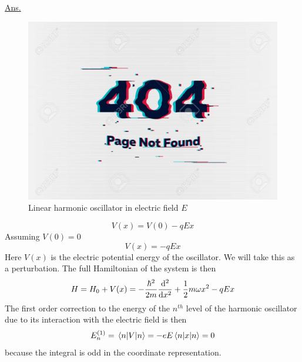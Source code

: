 \begin{enumerate}[label=Problem.\arabic*,start=1]
			\underline{Ans.}
			\begin{figure}
				\centering
				\includegraphics[width=0.5\linewidth]{Pictures/not-found.jpg}
				\caption{Linear harmonic oscillator in electric field $E$}
			\end{figure}
		\begin{equation}
			V(x) = V(0) - q E x
		\end{equation}
		Assuming $V(0) = 0$
		\begin{equation}
			V(x) =  - q E x
		\end{equation}
			Here $V(x)$ is the electric potential energy of the oscillator. We will take this as a perturbation. The full Hamiltonian of the system is then
			\begin{equation}
				H = H_0 + V(x) = - \frac{\hbar^2}{2 m} \dv[2]{}{x} + \frac{1}{2} m \omega x^2 - q E x
			\end{equation}
			The first order correction to the energy of the $n^{th}$ level of the harmonic oscillator due to its interaction with the electric field is then
			\begin{equation}
				E_n^{(1)} = \expval{V}{n} = -e E \expval{x}{n} = 0
			\end{equation}
			because the integral is odd in the coordinate representation.
			

\end{enumerate}
